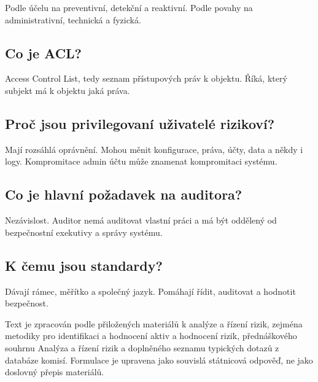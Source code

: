 Podle účelu na preventivní, detekční a reaktivní. Podle povahy na administrativní, technická a fyzická.

\subsection*{Co je ACL?}

Access Control List, tedy seznam přístupových práv k objektu. Říká, který subjekt má k objektu jaká práva.

\subsection*{Proč jsou privilegovaní uživatelé rizikoví?}

Mají rozsáhlá oprávnění. Mohou měnit konfigurace, práva, účty, data a někdy i logy. Kompromitace admin účtu může znamenat kompromitaci systému.

\subsection*{Co je hlavní požadavek na auditora?}

Nezávislost. Auditor nemá auditovat vlastní práci a má být oddělený od bezpečnostní exekutivy a správy systému.

\subsection*{K čemu jsou standardy?}

Dávají rámec, měřítko a společný jazyk. Pomáhají řídit, auditovat a hodnotit bezpečnost.

Text je zpracován podle přiložených materiálů k analýze a řízení rizik, zejména metodiky pro identifikaci a hodnocení aktiv a hodnocení rizik, přednáškového souhrnu Analýza a řízení rizik a doplněného seznamu typických dotazů z databáze komisí. Formulace je upravena jako souvislá státnicová odpověď, ne jako doslovný přepis materiálů.

\fi

\newpage

